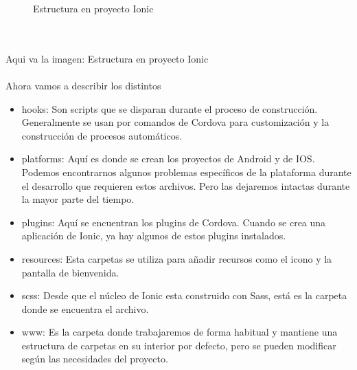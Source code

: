 \documentclass[a4paper, 11pt]{article}
\begin{document}
\begin{itemize}
\begin{figure}[H]
                     \caption{Estructura en proyecto Ionic}
                     \label{f:estructura}
              \end{figure}
              \\\\\textcolor[rgb]{1,0,0}{Aqui va la imagen: Estructura en proyecto Ionic}\\\\
            Ahora vamos a describir los distintos
            \begin{itemize}
                \item{hooks: Son scripts que se disparan durante el proceso de
                      construcción. Generalmente se usan por comandos de Cordova
                      para customización y la construcción de procesos automáticos.}
                \item{platforms: Aquí es donde se crean los proyectos de Android y
                      de IOS. Podemos encontrarnos algunos problemas específicos de
                      la plataforma durante el desarrollo que requieren estos
                      archivos. Pero las dejaremos intactas durante la mayor parte
                      del tiempo.}
                \item{plugins: Aquí se encuentran los plugins de Cordova. Cuando se
                      crea una aplicación de Ionic, ya hay algunos de estos plugins
                      instalados.}
                \item{resources: Esta carpetas se utiliza para añadir recursos como
                      el icono y la pantalla de bienvenida.}
                \item{scss: Desde que el núcleo de Ionic esta construido con Sass,
                      está es la carpeta donde se encuentra el archivo.}
                \item{www:  Es la carpeta donde trabajaremos de forma habitual y
                      mantiene una estructura de carpetas en su interior por
                      defecto, pero se pueden modificar según las necesidades del
                      proyecto.}
            \end{itemize}



\end{itemize}
\end{document}
